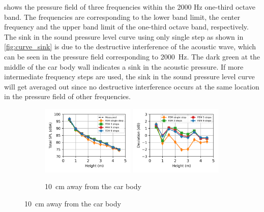  shows the pressure field of three frequencies within the 2000 Hz one-third octave band. The frequencies are corresponding to the lower band limit, the center frequency and the upper band limit of the one-third octave band, respectively. The sink in the sound pressure level curve using only single step as shown in \cref{fig:curve_sink} is due to the destructive interference of the acoustic wave, which can be seen in the pressure field corresponding to \SI{2000}{\hertz}. The dark green at the middle of the car body wall indicates a sink in the acoustic pressure. If more intermediate frequency steps are used, the sink in the sound pressure level curve will get averaged out since no destructive interference occurs at the same location in the pressure field of other frequencies.

\begin{figure}
	\begin{subfigure}[b]{\textwidth}
		\centering
		\includegraphics[width=0.49\textwidth]{fig/chap5/freq_steps/overall_SPL/pos_a.png}
		\includegraphics[width=0.49\textwidth]{fig/chap5/freq_steps/overall_SPL/pos_a_deviation.png}
		\caption{\SI{10}{\centi\meter} away from the car body}
	\end{subfigure}


\end{figure}
